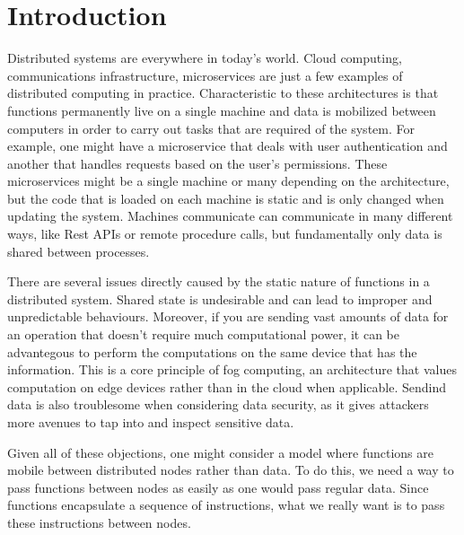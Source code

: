 
\chapter{Introduction}
\label{cha:introduction}



Distributed systems are everywhere in today's world. Cloud computing, communications infrastructure, microservices are just a few examples of distributed computing in practice. Characteristic to these architectures is that functions permanently live on a single machine and data is mobilized between computers in order to carry out tasks that are required of the system. For example, one might have a microservice that deals with user authentication and another that handles requests based on the user's permissions. These microservices might be a single machine or many depending on the architecture, but the code that is loaded on each machine is static and is only changed when updating the system. Machines communicate can communicate in many different ways, like Rest APIs or remote procedure calls, but fundamentally only data is shared between processes.


There are several issues directly caused by the static nature of functions in a distributed system. Shared state is undesirable and can lead to improper and unpredictable behaviours. Moreover, if you are sending vast amounts of data for an operation that doesn't require much computational power, it can be advantegous to perform the computations on the same device that has the information. This is a core principle of fog computing, an architecture that values computation on edge devices rather than in the cloud when applicable. Sendind data is also troublesome when considering data security, as it gives attackers more avenues to tap into and inspect sensitive data.

Given all of these objections, one might consider a model where functions are mobile between distributed nodes rather than data. To do this, we need a way to pass functions between nodes as easily as one would pass regular data. Since functions encapsulate a sequence of instructions, what we really want is to pass these instructions between nodes.


\endinput

